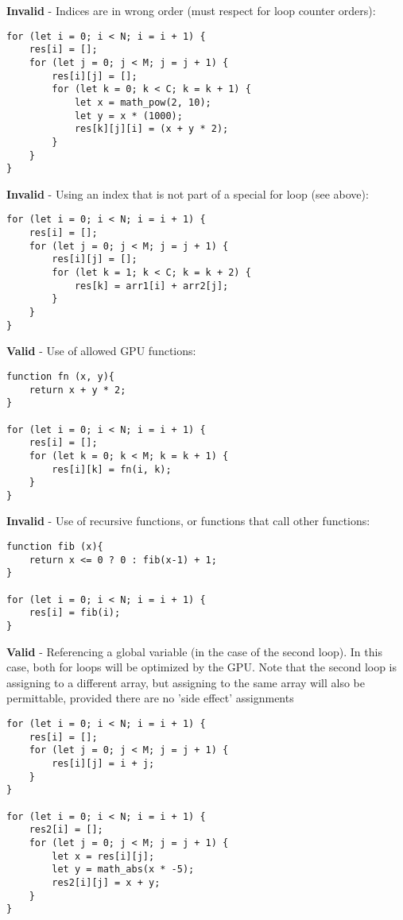 \textbf{Invalid} - Indices are in wrong order (must respect for loop counter orders):
\begin{verbatim}
for (let i = 0; i < N; i = i + 1) {
    res[i] = [];
    for (let j = 0; j < M; j = j + 1) {
        res[i][j] = [];
        for (let k = 0; k < C; k = k + 1) {
            let x = math_pow(2, 10);
            let y = x * (1000);
            res[k][j][i] = (x + y * 2);
        }
    }
}
\end{verbatim}

\textbf{Invalid} - Using an index that is not part of a special for loop (see above):
\begin{verbatim}
for (let i = 0; i < N; i = i + 1) {
    res[i] = [];
    for (let j = 0; j < M; j = j + 1) {
        res[i][j] = [];
        for (let k = 1; k < C; k = k + 2) {
            res[k] = arr1[i] + arr2[j];
        }
    }
}
\end{verbatim}

\textbf{Valid} - Use of allowed GPU functions:
\begin{verbatim}
function fn (x, y){
	return x + y * 2;
}

for (let i = 0; i < N; i = i + 1) {
    res[i] = [];
    for (let k = 0; k < M; k = k + 1) {
        res[i][k] = fn(i, k);
    }
}
\end{verbatim}

\textbf{Invalid} - Use of recursive functions, or functions that call other functions:
\begin{verbatim}
function fib (x){
	return x <= 0 ? 0 : fib(x-1) + 1;
}

for (let i = 0; i < N; i = i + 1) {
    res[i] = fib(i);
}
\end{verbatim}

\textbf{Valid} - Referencing a global variable (in the case of the second loop). In this case, both for loops will be optimized by the GPU. Note that the second loop is assigning to a different array, but assigning to the same array will also be permittable, provided there are no 'side effect' assignments 
\begin{verbatim}
for (let i = 0; i < N; i = i + 1) {
    res[i] = [];
    for (let j = 0; j < M; j = j + 1) {
        res[i][j] = i + j;
    }
}

for (let i = 0; i < N; i = i + 1) {
    res2[i] = [];
    for (let j = 0; j < M; j = j + 1) {
        let x = res[i][j];
        let y = math_abs(x * -5);
        res2[i][j] = x + y;
    }
}
\end{verbatim}

